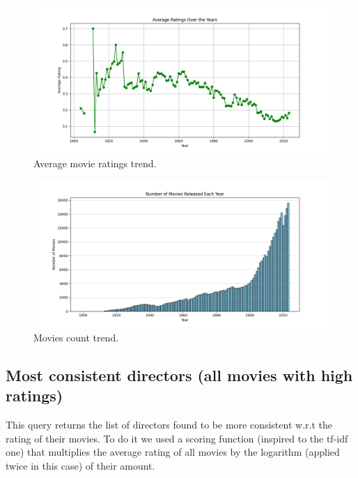 \documentclass{Configuration_Files/PoliMi3i_thesis}
\begin{document}
\begin{figure}[!h]
  \centering
  \includegraphics[width=\textwidth]{latex/letterboxd/visualization/average_ratings_trend.png}
  \caption{Average movie ratings trend.}
  \label{fig:ratings_trend}
\end{figure}
\clearpage
\begin{figure}[H]
  \centering
  \includegraphics[width=\textwidth]{latex/letterboxd/visualization/movies_count_trend.png}
  \caption{Movies count trend.}
  \label{fig:movies_count_trend}
\end{figure}


\subsection{Most consistent directors (all movies with high ratings)}
This query returns the list of directors found to be more consistent w.r.t the rating of their movies. To do it we used a scoring function (inspired to the tf-idf one) that multiplies the average rating of all movies by the logarithm (applied twice in this case) of their amount.

\inputminted[frame=single,framesep=10pt,breaklines]{cypher}{letterboxd/queries/query2.cypher}
\end{document}
